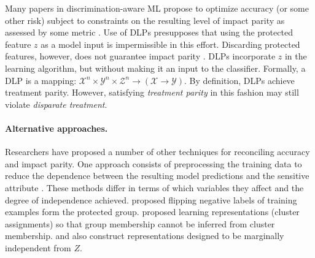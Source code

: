 Many papers in discrimination-aware ML 
propose to optimize accuracy (or some other risk) 
subject to constraints on the resulting 
level of impact parity 
as assessed by some metric \citep{pedreshi2008discrimination,kamiran2010discrimination,dwork2017decoupled,bechavod2017learning,hardt2016equality,ritov2017conditional}.  
Use of DLPs presupposes
that using the protected feature $z$ 
as a model input is impermissible in this effort. 
Discarding protected features, however, 
does not guarantee impact parity \cite{dwork2012fairness}.  
DLPs incorporate $z$ in the learning algorithm, 
but without making it an input to the classifier.  
Formally, a DLP is a mapping: 
$\mathcal{X}^n \times \mathcal{Y}^n \times \mathcal{Z}^n \rightarrow (\mathcal{X} \rightarrow \mathcal{Y})$.
By definition, DLPs achieve treatment parity.  
However, satisfying \emph{treatment parity} in this fashion 
may still violate \emph{disparate treatment}.

\paragraph{Alternative approaches.} 
Researchers have proposed a number of other techniques for reconciling accuracy and impact parity. 
One approach consists of preprocessing
the training data 
to reduce the dependence between 
the resulting model predictions 
and the sensitive attribute \citep{kamiran2009classifying,kamiran2012data,
feldman2015certifying,adler2016auditing,
johndrow2017algorithm}. 
These methods differ in terms of 
which variables they affect
and the degree of independence achieved.  
\cite{kamiran2009classifying} 
proposed flipping negative labels 
of training examples form the protected group.
\cite{zemel2013learning} proposed 
learning representations (cluster assignments)
so that group membership 
cannot be inferred from cluster membership. 
\cite{feldman2015certifying} 
and \cite{johndrow2017algorithm} 
also construct representations
designed to be marginally independent from $Z$.  


